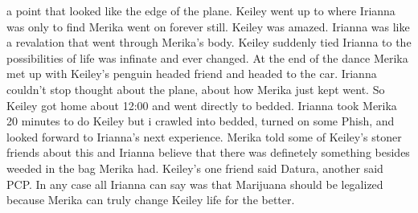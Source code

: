 \documentclass[12pt]{book}
\begin{document}
a point that looked like the edge of the plane. Keiley went up to where Irianna was only to find Merika went on forever still. Keiley was amazed. Irianna was like a revalation that went through Merika's body. Keiley suddenly tied Irianna to the possibilities of life was infinate and ever changed. At the end of the dance Merika met up with Keiley's penguin headed friend and headed to the car. Irianna couldn't stop thought about the plane, about how Merika just kept went. So Keiley got home about 12:00 and went directly to bedded. Irianna took Merika 20 minutes to do Keiley but i crawled into bedded, turned on some Phish, and looked forward to Irianna's next experience. Merika told some of Keiley's stoner friends about this and Irianna believe that there was definetely something besides weeded in the bag Merika had. Keiley's one friend said Datura, another said PCP. In any case all Irianna can say was that Marijuana should be legalized because Merika can truly change Keiley life for the better.
\end{document}
